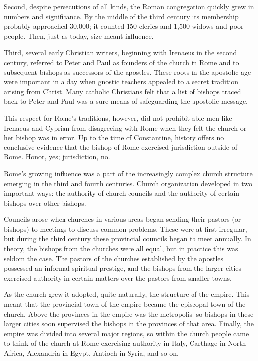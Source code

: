 Second, despite persecutions of all kinds, the Roman congregation quickly grew in numbers and
significance. By the middle of the third century its membership probably approached 30,000; it
counted 150 clerics and 1,500 widows and poor people. Then, just as today, size meant influence.

Third, several early Christian writers, beginning with Irenaeus in the second century, referred to
Peter and Paul as founders of the church in Rome and to subsequent bishops as successors of the
apostles. These roots in the apostolic age were important in a day when gnostic teachers appealed to
a secret tradition arising from Christ. Many catholic Christians felt that a list of bishops traced
back to Peter and Paul was a sure means of safeguarding the apostolic message.

This respect for Rome’s traditions, however, did not prohibit able men like Irenaeus and Cyprian
from disagreeing with Rome when they felt the church or her bishop was in error. Up to the time of
Constantine, history offers no conclusive evidence that the bishop of Rome exercised jurisdiction
outside of Rome. Honor, yes; jurisdiction, no.

Rome’s growing influence was a part of the increasingly complex church structure emerging in the
third and fourth centuries. Church organization developed in two important ways: the authority of
church councils and the authority of certain bishops over other bishops.

Councils arose when churches in various areas began sending their pastors (or bishops) to meetings
to discuss common problems. These were at first irregular, but during the third century these
provincial councils began to meet annually. In theory, the bishops from the churches were all equal,
but in practice this was seldom the case. The pastors of the churches established by the apostles
possessed an informal spiritual prestige, and the bishops from the larger cities exercised authority
in certain matters over the pastors from smaller towns.

As the church grew it adopted, quite naturally, the structure of the empire. This meant that the
provincial town of the empire became the episcopal town of the church. Above the provinces in the
empire was the metropolis, so bishops in these larger cities soon supervised the bishops in the
provinces of that area. Finally, the empire was divided into several major regions, so within the
church people came to think of the church at Rome exercising authority in Italy, Carthage in North
Africa, Alexandria in Egypt, Antioch in Syria, and so on.

